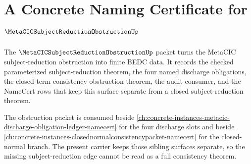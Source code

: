 \chapter{A Concrete Naming Certificate for $\MetaCICSubjectReductionObstructionUp$}
\label{ch:concrete-instances-metacic-subject-reduction-obstruction-namecert}

The $\MetaCICSubjectReductionObstructionUp$ packet turns the MetaCIC subject-reduction obstruction into finite BEDC data. It records the checked parameterized subject-reduction theorem, the four named discharge obligations, the closed-term consistency obstruction theorem, the audit consumer, and the NameCert rows that keep this surface separate from a closed subject-reduction theorem.

The obstruction packet is consumed beside \autoref{ch:concrete-instances-metacic-discharge-obligation-ledger-namecert} for the four discharge slots and beside \autoref{ch:concrete-instances-closednormalconsistencypacket-namecert} for the closed-normal branch. The present carrier keeps those sibling surfaces separate, so the missing subject-reduction edge cannot be read as a full consistency theorem.

